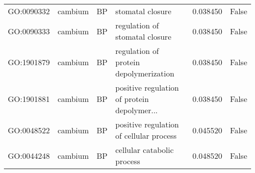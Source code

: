 \begin{longtable}{llllrl}
GO:0090332 & cambium & BP &                              stomatal closure  & 0.038450 &   False \\
GO:0090333 & cambium & BP &                regulation of stomatal closure  & 0.038450 &   False \\
GO:1901879 & cambium & BP &        regulation of protein depolymerization  & 0.038450 &   False \\
GO:1901881 & cambium & BP &   positive regulation of protein depolymer...  & 0.038450 &   False \\
GO:0048522 & cambium & BP &       positive regulation of cellular process  & 0.045520 &   False \\
GO:0044248 & cambium & BP &                    cellular catabolic process  & 0.048520 &   False \\
\bottomrule
\end{longtable}
